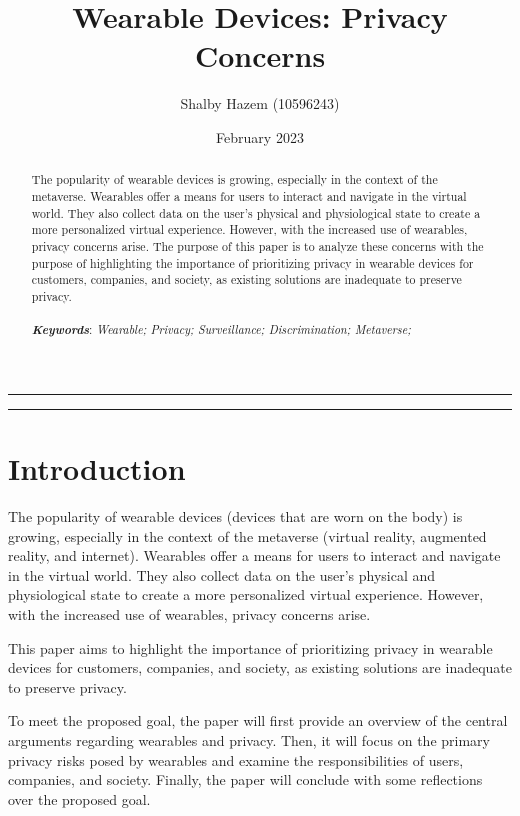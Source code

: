 \documentclass{article}
\title{\textbf{\huge Wearable Devices: Privacy Concerns}}
\author{Shalby Hazem (10596243)}
\date{February 2023}
\begin{document}
\pagestyle{headings}	
\newpage
\setcounter{page}{1}
\renewcommand{\thepage}{\arabic{page}}

	
\maketitle
	
\noindent\rule{15cm}{0.5pt}
	\begin{abstract}
        The popularity of wearable devices is growing, especially in the context of the metaverse. Wearables offer a means for users to interact and navigate in the virtual world. They also collect data on the user's physical and physiological state to create a more personalized virtual experience. However, with the increased use of wearables, privacy concerns arise. The purpose of this paper is to analyze these concerns with the purpose of highlighting the importance of prioritizing privacy in wearable devices for customers, companies, and society, as existing solutions are inadequate to preserve privacy.
        \\ \\
            \textbf{\textit{Keywords}}: \textit{Wearable; Privacy; Surveillance; Discrimination; Metaverse;}
	\end{abstract}
\noindent\rule{15cm}{0.4pt}

\tableofcontents

\section{Introduction}

The popularity of wearable devices (devices that are worn on the body) is growing, especially in the context of the metaverse (virtual reality, augmented reality, and internet). Wearables offer a means for users to interact and navigate in the virtual world. They also collect data on the user's physical and physiological state to create a more personalized virtual experience. However, with the increased use of wearables, privacy concerns arise.

This paper aims to highlight the importance of prioritizing privacy in wearable devices for customers, companies, and society, as existing solutions are inadequate to preserve privacy.

To meet the proposed goal, the paper will first provide an overview of the central arguments regarding wearables and privacy. Then, it will focus on the primary privacy risks posed by wearables \cite{regenbrecht_pervasive_2022} and examine the responsibilities of users, companies, and society. Finally, the paper will conclude with some reflections over the proposed goal.
\end{document}
